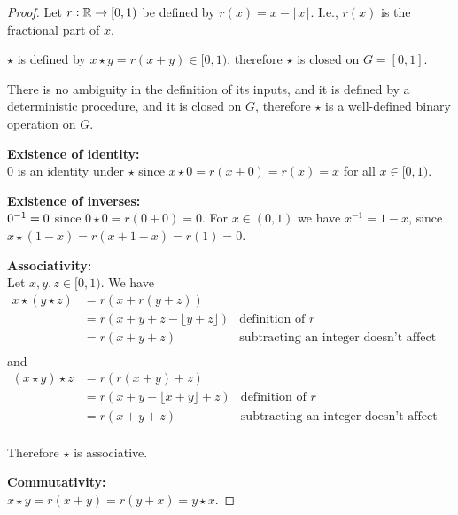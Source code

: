 \begin{proof}
  Let $r: \mathbb{R} \to [0, 1)$ be defined by $r(x) = x - \lfloor x \rfloor$. I.e., $r(x)$ is the fractional part of $x$.

  $\star$ is defined by $x \star y = r(x + y) \in [0, 1)$, therefore $\star$ is closed on $G = [0, 1]$.

  There is no ambiguity in the definition of its inputs, and it is defined by a deterministic
  procedure, and it is closed on $G$, therefore $\star$ is a well-defined binary operation on $G$.

  {\bf Existence of identity:}\\
  $0$ is an identity under $\star$ since $x \star 0 = r(x + 0) = r(x) = x$ for all $x \in [0, 1)$.

  {\bf Existence of inverses:}\\
  $0^{-1} = 0$ since $0 \star 0 = r(0 + 0) = 0$.
  For $x \in (0, 1)$ we have $x^{-1} = 1 - x$, since $x \star (1 - x) = r(x + 1 - x) = r(1) = 0$.

  {\bf Associativity:}\\
  Let $x, y, z \in [0, 1)$. We have
  \begin{align*}
    x \star (y \star z)
    &= r(x + r(y + z)) \\
    &= r(x + y + z - \lfloor y + z \rfloor) &\text{definition of $r$}\\
    &= r(x + y + z)                         &\text{subtracting an integer doesn't affect fractional part}\\
  \end{align*}
  and
\begin{align*}
  (x \star y) \star z
  &= r(r(x + y) + z) \\
  &= r(x + y - \lfloor x + y \rfloor + z)    &\text{definition of $r$}\\
  &= r(x + y + z)                            &\text{subtracting an integer doesn't affect fractional part}\\
\end{align*}

Therefore $\star$ is associative.

  {\bf Commutativity:}\\
  $x \star y = r(x + y) = r(y + x) = y \star x$.
\end{proof}

